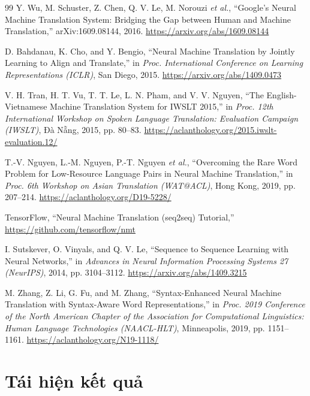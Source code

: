 \documentclass[11pt,a4paper]{article}
\begin{document}
\begin{thebibliography}{99}
Y. Wu, M. Schuster, Z. Chen, Q. V. Le, M. Norouzi \emph{et al.}, ``Google's
Neural Machine Translation System: Bridging the Gap between Human and Machine
Translation,'' arXiv:1609.08144, 2016. \url{https://arxiv.org/abs/1609.08144}

D. Bahdanau, K. Cho, and Y. Bengio, ``Neural Machine Translation by Jointly
Learning to Align and Translate,'' in \emph{Proc. International Conference on
Learning Representations (ICLR)}, San Diego, 2015.
\url{https://arxiv.org/abs/1409.0473}

V. H. Tran, H. T. Vu, T. T. Le, L. N. Pham, and V. V. Nguyen, ``The
English-Vietnamese Machine Translation System for IWSLT 2015,'' in \emph{Proc.
12th International Workshop on Spoken Language Translation: Evaluation Campaign
(IWSLT)}, Đà Nẵng, 2015, pp. 80--83.
\url{https://aclanthology.org/2015.iwslt-evaluation.12/}

T.-V. Nguyen, L.-M. Nguyen, P.-T. Nguyen \emph{et al.}, ``Overcoming the Rare
Word Problem for Low-Resource Language Pairs in Neural Machine Translation,'' in
\emph{Proc. 6th Workshop on Asian Translation (WAT@ACL)}, Hong Kong, 2019,
pp. 207--214. \url{https://aclanthology.org/D19-5228/}

TensorFlow, ``Neural Machine Translation (seq2seq) Tutorial,''
\url{https://github.com/tensorflow/nmt}

I. Sutskever, O. Vinyals, and Q. V. Le, ``Sequence to Sequence Learning with
Neural Networks,'' in \emph{Advances in Neural Information Processing Systems 27
(NeurIPS)}, 2014, pp. 3104--3112. \url{https://arxiv.org/abs/1409.3215}

M. Zhang, Z. Li, G. Fu, and M. Zhang, ``Syntax-Enhanced Neural Machine
Translation with Syntax-Aware Word Representations,'' in \emph{Proc. 2019
Conference of the North American Chapter of the Association for Computational
Linguistics: Human Language Technologies (NAACL-HLT)}, Minneapolis, 2019,
pp. 1151--1161. \url{https://aclanthology.org/N19-1118/}

\end{thebibliography}

\appendix
\section{Tái hiện kết quả}
\end{document}
